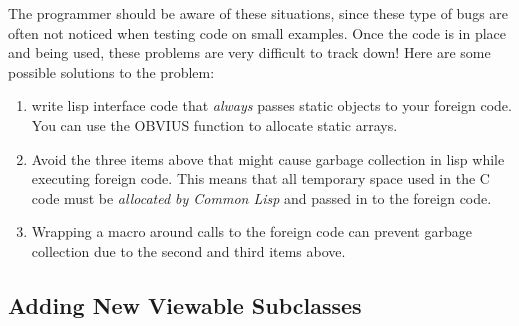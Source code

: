 The programmer should be aware of these situations, since these type
of bugs are often not noticed when testing code on small examples.
Once the code is in place and being used, these problems are very
difficult to track down!  Here are some possible solutions to the
problem:
\begin{enumerate}
\item write lisp interface code that {\em always} passes static
objects to your foreign code.  You can use the OBVIUS
 function to allocate static arrays.
\item Avoid the three items above that might cause garbage collection in lisp
while executing foreign code.  This means that all temporary space
used in the C code must be {\em allocated by Common Lisp} and passed
in to the foreign code.
\item Wrapping a  macro around calls to the
foreign code can prevent garbage collection due to the second and
third items above.
\end{enumerate}

\subsection{Adding New Viewable Subclasses}
\label{sec:new-viewable}

